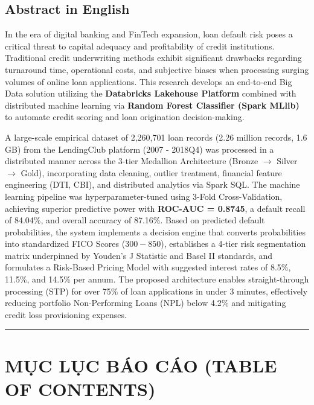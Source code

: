 \documentclass[
  13pt,
  a4paper,
]{report}
\begin{document}
\subsection{Abstract in English}\label{abstract-in-english}

In the era of digital banking and FinTech expansion, loan default risk
poses a critical threat to capital adequacy and profitability of credit
institutions. Traditional credit underwriting methods exhibit
significant drawbacks regarding turnaround time, operational costs, and
subjective biases when processing surging volumes of online loan
applications. This research develops an end-to-end Big Data solution
utilizing the \textbf{Databricks Lakehouse Platform} combined with
distributed machine learning via \textbf{Random Forest Classifier (Spark
MLlib)} to automate credit scoring and loan origination decision-making.

A large-scale empirical dataset of 2,260,701 loan records (2.26 million
records, 1.6 GB) from the LendingClub platform (2007 - 2018Q4) was
processed in a distributed manner across the 3-tier Medallion
Architecture (Bronze \(\rightarrow\) Silver \(\rightarrow\) Gold),
incorporating data cleaning, outlier treatment, financial feature
engineering (DTI, CBI), and distributed analytics via Spark SQL. The
machine learning pipeline was hyperparameter-tuned using 3-Fold
Cross-Validation, achieving superior predictive power with
\textbf{ROC-AUC = 0.8745}, a default recall of 84.04\%, and overall
accuracy of 87.16\%. Based on predicted default probabilities, the
system implements a decision engine that converts probabilities into
standardized FICO Scores (\(300 - 850\)), establishes a 4-tier risk
segmentation matrix underpinned by Youden's J Statistic and Basel II
standards, and formulates a Risk-Based Pricing Model with suggested
interest rates of 8.5\%, 11.5\%, and 14.5\% per annum. The proposed
architecture enables straight-through processing (STP) for over 75\% of
loan applications in under 3 minutes, effectively reducing portfolio
Non-Performing Loans (NPL) below 4.2\% and mitigating credit loss
provisioning expenses.

\newpage

\begin{center}\rule{0.5\linewidth}{0.5pt}\end{center}

\section{MỤC LỤC BÁO CÁO (TABLE OF
CONTENTS)}\label{mux1ee5c-lux1ee5c-buxe1o-cuxe1o-table-of-contents}
\end{document}
